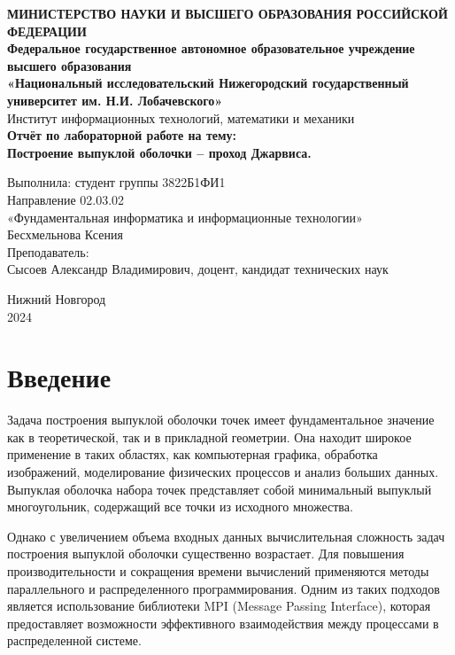 \documentclass[a4paper,12pt]{article}
\begin{document}
\begin{titlepage}
\begin{center}
\textbf{МИНИСТЕРСТВО НАУКИ И ВЫСШЕГО ОБРАЗОВАНИЯ РОССИЙСКОЙ ФЕДЕРАЦИИ} \\[0.5cm]
\textbf{Федеральное государственное автономное образовательное учреждение высшего образования} \\[0.5cm]
\textbf{«Национальный исследовательский Нижегородский государственный университет им. Н.И. Лобачевского»} \\[0.5cm]
Институт информационных технологий, математики и механики \\
\vfill
{\Large
\textbf{Отчёт по лабораторной работе на тему:} \\[0.5cm]
\textbf{Построение выпуклой оболочки – проход Джарвиса.} \\
}
\vfill
\begin{flushright}
Выполнила: студент группы 3822Б1ФИ1 \\
Направление 02.03.02 \\
«Фундаментальная информатика и информационные технологии» \\
Бесхмельнова Ксения \\
\vspace{1cm}
Преподаватель: \\
Сысоев Александр Владимирович, доцент, кандидат технических наук \\
\end{flushright}
\vfill
Нижний Новгород \\
2024
\end{center}
\end{titlepage}

\tableofcontents
\newpage

\section{Введение}
Задача построения выпуклой оболочки точек имеет фундаментальное значение как в теоретической, так и в прикладной геометрии. Она находит широкое применение в таких областях, как компьютерная графика, обработка изображений, моделирование физических процессов и анализ больших данных. Выпуклая оболочка набора точек представляет собой минимальный выпуклый многоугольник, содержащий все точки из исходного множества.

Однако с увеличением объема входных данных вычислительная сложность задач построения выпуклой оболочки существенно возрастает. Для повышения производительности и сокращения времени вычислений применяются методы параллельного и распределенного программирования. Одним из таких подходов является использование библиотеки MPI (Message Passing Interface), которая предоставляет возможности эффективного взаимодействия между процессами в распределенной системе.
\end{document}

